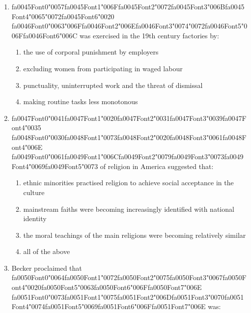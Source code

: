 \documentclass[12pt]{article}
\begin{document}
\begin{enumerate}[label=\arabic*.]
\begin{enumerate}[label=(\alph*)]
\end{enumerate}
\item {\csname fa0045Font0\endcsname\char"0057}{\csname fa0045Font1\endcsname\char"006F}{\csname fa0045Font2\endcsname\char"0072}{\csname fa0045Font3\endcsname\char"006B}{\csname fa0045Font4\endcsname\char"0065}{\char"0072}{\csname fa0045Font6\endcsname\char"0020} {\csname fa0046Font0\endcsname\char"0063}{\char"006F}{\csname fa0046Font2\endcsname\char"006E}{\csname fa0046Font3\endcsname\char"0074}{\char"0072}{\csname fa0046Font5\endcsname\char"006F}{\csname fa0046Font6\endcsname\char"006C} was exercised in the 19th century factories by:
\begin{enumerate}[label=(\alph*)]
    \item the use of corporal punishment by employers
    \item excluding women from participating in waged labour
    \item punctuality, uninterrupted work and the threat of dismissal
    \item making routine tasks less monotonous
\end{enumerate}
\item {\csname fa0047Font0\endcsname\char"0041}{\csname fa0047Font1\endcsname\char"0020}{\csname fa0047Font2\endcsname\char"0031}{\csname fa0047Font3\endcsname\char"0039}{\csname fa0047Font4\endcsname\char"0035} {\csname fa0048Font0\endcsname\char"0030}{\csname fa0048Font1\endcsname\char"0073}{\csname fa0048Font2\endcsname\char"0020}{\csname fa0048Font3\endcsname\char"0061}{\csname fa0048Font4\endcsname\char"006E} {\csname fa0049Font0\endcsname\char"0061}{\csname fa0049Font1\endcsname\char"006C}{\csname fa0049Font2\endcsname\char"0079}{\csname fa0049Font3\endcsname\char"0073}{\csname fa0049Font4\endcsname\char"0069}{\csname fa0049Font5\endcsname\char"0073} of religion in America suggested that:
\begin{enumerate}[label=(\alph*)]
    \item ethnic minorities practised religion to achieve social acceptance in the culture
    \item mainstream faiths were becoming increasingly identified with national identity
    \item the moral teachings of the main religions were becoming relatively similar
    \item all of the above
\end{enumerate}
\item Becker proclaimed that {\csname fa0050Font0\endcsname\char"0064}{\csname fa0050Font1\endcsname\char"0072}{\csname fa0050Font2\endcsname\char"0075}{\csname fa0050Font3\endcsname\char"0067}{\csname fa0050Font4\endcsname\char"0020}{\csname fa0050Font5\endcsname\char"0063}{\csname fa0050Font6\endcsname\char"006F}{\csname fa0050Font7\endcsname\char"006E} {\csname fa0051Font0\endcsname\char"0073}{\csname fa0051Font1\endcsname\char"0075}{\csname fa0051Font2\endcsname\char"006D}{\csname fa0051Font3\endcsname\char"0070}{\csname fa0051Font4\endcsname\char"0074}{\csname fa0051Font5\endcsname\char"0069}{\csname fa0051Font6\endcsname\char"006F}{\csname fa0051Font7\endcsname\char"006E} was:

\end{enumerate}
\end{document}
